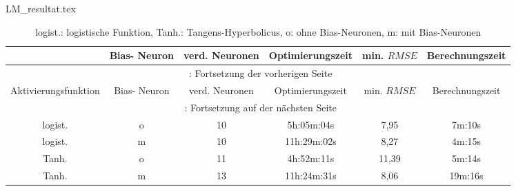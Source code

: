 \begin{filecontents*}{LM_resultat.tex}
{
\captionsetup{skip=1pt,margin=5pt,position=below} %

\begin{longtable}{cccccc}
    \caption[Optimale Parameter und die erreichte Prognosegenauigkeit des LM-Alg.]{Optimale Parameter und die erreichte Prognosegenauigkeit, in Form des $RMSE$-Wertes, des LM-Algorithmus.}\label{tab:LM_resultat}\\
    \toprule
    \hiderowcolors

       \multicolumn{1}{Y}{Aktivierungsfunktion} &      \multicolumn{1}{Y}{Bias- Neuron} &  \multicolumn{1}{Y}{verd. Neuronen} &  \multicolumn{1}{Y}{Optimierungszeit} & \multicolumn{1}{Y}{min. $RMSE$}  & \multicolumn{1}{Y}{Berechnungszeit} \\

    \midrule
    \endfirsthead
        \multicolumn{6}{c}{\footnotesize \tablename\ \thetable{}: Fortsetzung der vorherigen Seite} \\
    \toprule
       \multicolumn{1}{Y}{Aktivierungsfunktion} &      \multicolumn{1}{Y}{Bias- Neuron} &  \multicolumn{1}{Y}{verd. Neuronen} &  \multicolumn{1}{Y}{Optimierungszeit} & \multicolumn{1}{Y}{min. $RMSE$}  & \multicolumn{1}{Y}{Berechnungszeit} \\
    \midrule
    \endhead
    \midrule
        \multicolumn{6}{c}{{\footnotesize \tablename\ \thetable{}: Fortsetzung auf der nächsten Seite}} \\
    \bottomrule
    \endfoot
    \bottomrule
        \caption*{\footnotesize logist.: logistische Funktion, Tanh.: Tangens-Hyperbolicus, o: ohne Bias-Neuronen, m: mit Bias-Neuronen}
  
    \endlastfoot
    \showrowcolors
        logist.                 & o       & 10  & 5h:05m:04s  & 7,95  & 7m:10s          \\
        logist.                 & m       & 10  & 11h:29m:02s & 8,27  & 4m:15s          \\
        Tanh.                   & o       & 11  & 4h:52m:11s  & 11,39 & 5m:14s          \\
        Tanh.                   & m       & 13  & 11h:24m:31s & 8,06  & 19m:16s         \\

\end{longtable}

}
\end{filecontents*}

